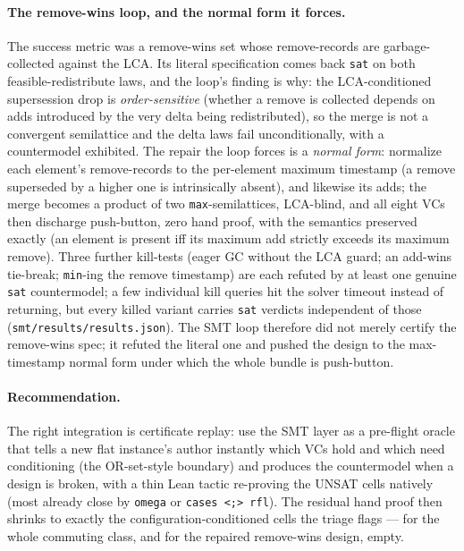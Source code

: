 \documentclass[11pt]{article}
\newcommand{\code}[1]{\texttt{#1}}
\begin{document}
\paragraph{The remove-wins loop, and the normal form it forces.} The success
metric was a remove-wins set whose remove-records are garbage-collected
against the LCA. Its literal specification comes back \code{sat} on both
feasible-redistribute laws, and the loop's finding is why: the
LCA-conditioned supersession drop is \emph{order-sensitive} (whether a
remove is collected depends on adds introduced by the very delta being
redistributed), so the merge is not a convergent semilattice and the
delta laws fail unconditionally, with a countermodel exhibited. The
repair the loop forces is a \emph{normal form}: normalize each element's
remove-records to the per-element maximum timestamp (a remove superseded
by a higher one is intrinsically absent), and likewise its adds; the
merge becomes a product of two \code{max}-semilattices, LCA-blind, and all
eight VCs then discharge push-button, zero hand proof, with the semantics
preserved exactly (an element is present iff its maximum add strictly
exceeds its maximum remove). Three further kill-tests (eager GC without
the LCA guard; an add-wins tie-break; \code{min}-ing the remove
timestamp) are each refuted by at least one genuine \code{sat}
countermodel; a few individual kill queries hit the solver timeout
instead of returning, but every killed variant carries \code{sat}
verdicts independent of those (\code{smt/results/results.json}). The SMT loop therefore did not merely certify the remove-wins spec;
it refuted the literal one and pushed the design to the max-timestamp
normal form under which the whole bundle is push-button.

\paragraph{Recommendation.} The right integration is certificate replay:
use the SMT layer as a pre-flight oracle that tells a new flat instance's
author instantly which VCs hold and which need conditioning (the
OR-set-style boundary) and produces the countermodel when a design is
broken, with a thin Lean tactic re-proving the UNSAT cells natively (most
already close by \code{omega} or \code{cases <;> rfl}). The residual hand
proof then shrinks to exactly the configuration-conditioned cells the
triage flags --- for the whole commuting class, and for the repaired
remove-wins design, empty.

\fi
\ifdefined\salPaperA
\end{document}
